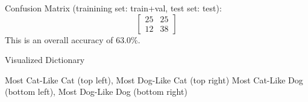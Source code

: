 \documentclass[fleqn]{article}
\begin{document}
Confusion Matrix (trainining set: train+val, test set: test):
\[
  \begin{bmatrix}
    25 & 25 \\
    12 & 38
  \end{bmatrix}
\]
This is an overall accuracy of 63.0\%.
\begin{center}
    Visualized Dictionary
\end{center}
\begin{center}
    Most Cat-Like Cat (top left), Most Dog-Like Cat (top right)\break
    Most Cat-Like Dog (bottom left), Most Dog-Like Dog (bottom right)
\end{center}
\end{document}
